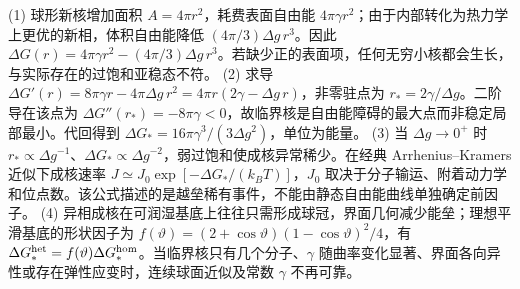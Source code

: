 (1) 球形新核增加面积 \(A=4\pi r^2\)，耗费表面自由能 \(4\pi\gamma r^2\)；由于内部转化为热力学上更优的新相，体积自由能降低 \((4\pi/3)\Delta g\,r^3\)。因此 \(\Delta G(r)=4\pi\gamma r^2-(4\pi/3)\Delta g\,r^3\)。若缺少正的表面项，任何无穷小核都会生长，与实际存在的过饱和亚稳态不符。
(2) 求导 \(\Delta G'(r)=8\pi\gamma r-4\pi\Delta g\,r^2=4\pi r(2\gamma-\Delta g\,r)\)，非零驻点为 \(r_*=2\gamma/\Delta g\)。二阶导在该点为 \(\Delta G''(r_*)=-8\pi\gamma<0\)，故临界核是自由能障碍的最大点而非稳定局部最小。代回得到 \(\Delta G_*=16\pi\gamma^3/(3\Delta g^2)\)，单位为能量。
(3) 当 \(\Delta g\to0^+\) 时 \(r_*\propto\Delta g^{-1}\)、\(\Delta G_*\propto\Delta g^{-2}\)，弱过饱和使成核异常稀少。在经典 Arrhenius–Kramers 近似下成核速率 \(J\simeq J_0\exp[-\Delta G_*/(k_BT)]\)，\(J_0\) 取决于分子输运、附着动力学和位点数。该公式描述的是越垒稀有事件，不能由静态自由能曲线单独确定前因子。
(4) 异相成核在可润湿基底上往往只需形成球冠，界面几何减少能垒；理想平滑基底的形状因子为 \(f(\vartheta)=(2+\cos\vartheta)(1-\cos\vartheta)^2/4\)，有 \(\Delta G_*^{\rm het}=f(\vartheta)\Delta G_*^{\rm hom}\)。当临界核只有几个分子、\(\gamma\) 随曲率变化显著、界面各向异性或存在弹性应变时，连续球面近似及常数 \(\gamma\) 不再可靠。
